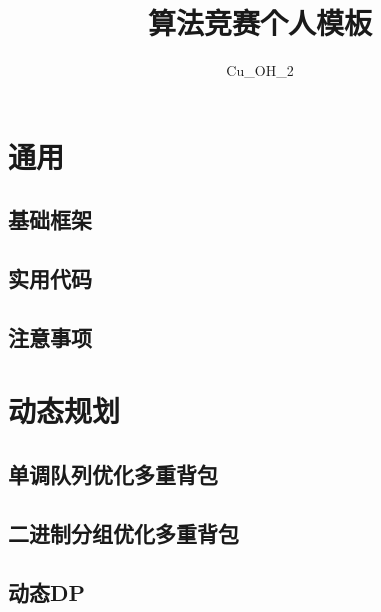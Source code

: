 \documentclass[twocolumn,a4]{article}  %
\title{\CJKfamily{hei} \bfseries 算法竞赛个人模板}
\author{Cu\_OH\_2}
\begin{document}
	\begin{titlepage}
		\maketitle
	\end{titlepage}
	
	\newpage
	\pagestyle{empty}
	\renewcommand{\contentsname}{目录}
	\tableofcontents
	
	\newpage
	\clearpage
	\newpage
	\pagestyle{fancy}
	\setcounter{page}{1} %
	
	\section{通用}
		\subsection{基础框架}
			
			
		\subsection{实用代码}
			
			
		\subsection{注意事项}
		 	
			
			
	\section{动态规划}
	 	\subsection{单调队列优化多重背包}
	 	 	
	 	 	
	 	\subsection{二进制分组优化多重背包}
	 	 	
	 	 	
		\subsection{动态DP}
	 	 	
	 	 	
\end{document}
